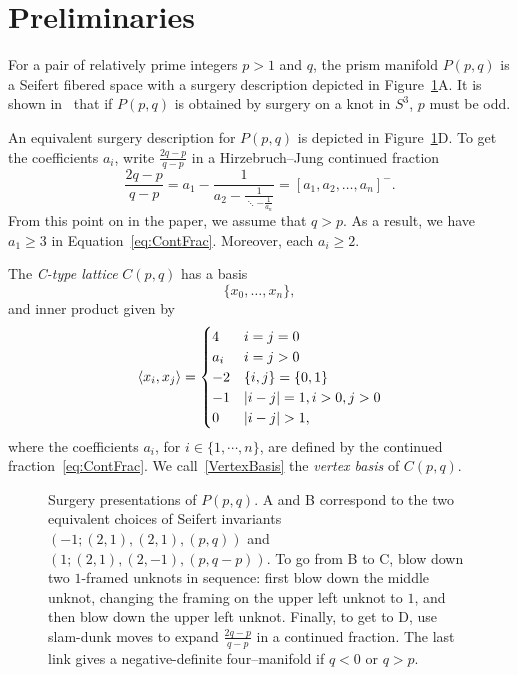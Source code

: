 \section{Preliminaries}\label{sec:Preliminaries}

For a pair of relatively prime integers $p>1$ and $q$, the prism manifold $P(p,q)$ is a Seifert fibered space with a surgery description depicted in Figure~\ref{links}A. It is shown in~\cite{Prism2016} that if $P(p,q)$ is obtained by surgery on a knot in $S^3$, $p$ must be odd. 

An equivalent surgery description for $P(p,q)$ is depicted in Figure~\ref{links}D. To get the coefficients $a_i$, write $\frac{2q-p}{q-p}$ in a Hirzebruch--Jung continued fraction
\begin{equation}\label{eq:ContFrac}
\displaystyle \frac{2q-p}{q-p} = a_1 - \frac{1}{a_2 - \displaystyle\frac{1}{\ddots - \displaystyle\frac{1}{a_n}}} = [a_1,a_2,\dots,a_n]^-.
\end{equation}
From this point on in the paper, we assume that $q>p$. As a result, we have $a_1\ge 3$ in Equation~\eqref{eq:ContFrac}. Moreover, each $a_i\ge2$.

\begin{definition}\label{def:CType}
The \emph{C-type lattice} $C(p,q)$ has a basis 
\begin{equation}\label{VertexBasis}
\{x_0,\dots,x_n\},
\end{equation}
and inner product given by
\begin{equation*}
\braket{x_i}{x_j} = \begin{cases}
4 & i = j = 0 \\
a_i & i = j > 0 \\
-2 & \{i,j\} =\{ 0,1\} \\
-1 & |i-j| = 1, i > 0, j > 0\\
0 &|i-j|>1,
\end{cases}
\end{equation*}
where the coefficients $a_i$, for $i\in \{1,\cdots,n\}$, are defined by the continued fraction~\eqref{eq:ContFrac}. We call~\eqref{VertexBasis} the \emph{vertex basis} of $C(p,q)$.
\end{definition}

\begin{figure}
\centering
\def\svgwidth{\textwidth}

\caption{Surgery presentations of $P(p,q)$. A and B correspond to the two equivalent choices of Seifert invariants $(-1;(2,1),(2,1),(p,q))$ and $(1; (2,1),(2,-1),(p,q-p))$. To go from B to C, blow down two $1$-framed unknots in sequence: first blow down the middle unknot, changing the framing on the upper left unknot to $1$, and then blow down the upper left unknot. Finally, to get to D, use slam-dunk moves to expand $\frac{2q-p}{q-p}$ in a continued fraction. The last link gives a negative-definite four--manifold if $q < 0$ or $q > p$.}
\label{links}
\end{figure}

